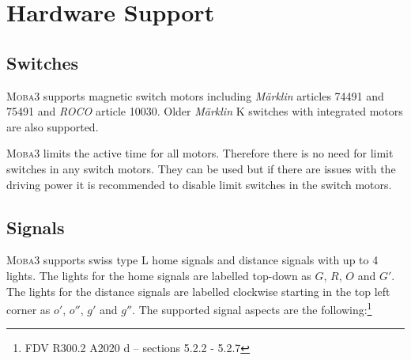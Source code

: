 \documentclass{scrreprt}
\begin{document}
\chapter{Hardware Support}
\section{Switches}
\textsc{Moba3} supports magnetic switch motors including \emph{Märklin} articles 74491 and 75491 and \emph{ROCO} article 10030. Older \emph{Märklin} K switches with integrated motors are also supported.

\textsc{Moba3} limits the active time for all motors.
Therefore there is no need for limit switches in any switch motors.
They can be used but if there are issues with the driving power it is recommended to disable limit switches in the switch motors.

\section{Signals}
\textsc{Moba3} supports swiss type L home signals and distance signals with up to 4 lights.
The lights for the home signals are labelled top-down as $G$, $R$, $O$ and $G'$.
The lights for the distance signals are labelled clockwise starting in the top left corner as $o'$, $o''$, $g'$ and $g''$.
The supported signal aspects are the following:\footnote{FDV R300.2 A2020 d -- sections 5.2.2 - 5.2.7}
\end{document}
